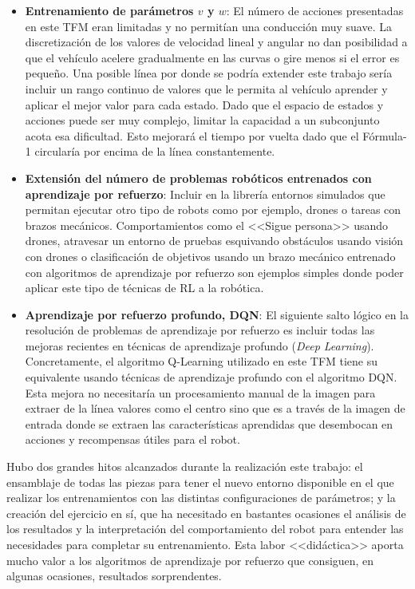 \begin{itemize}
    \item \textbf{Entrenamiento de parámetros $v$ y $w$}: El número de acciones presentadas en este TFM eran limitadas y no permitían una conducción muy suave. La discretización de los valores de velocidad lineal y angular no dan posibilidad a que el vehículo acelere gradualmente en las curvas o gire menos si el error es pequeño. Una posible línea por donde se podría extender este trabajo sería incluir un rango continuo de valores que le permita al vehículo aprender y aplicar el mejor valor para cada estado. Dado que el espacio de estados y acciones puede ser muy complejo, limitar la capacidad a un subconjunto acota esa dificultad. Esto mejorará el tiempo por vuelta dado que el Fórmula-1 circularía por encima de la línea constantemente.\\
    
    \item \textbf{Extensión del número de problemas robóticos entrenados con aprendizaje por refuerzo}: Incluir en la librería entornos simulados que permitan ejecutar otro tipo de robots como por ejemplo, drones o tareas con brazos mecánicos. Comportamientos como el <<Sigue persona>> usando drones, atravesar un entorno de pruebas esquivando obstáculos usando visión con drones o clasificación de objetivos usando un brazo mecánico entrenado con algoritmos de aprendizaje por refuerzo son ejemplos simples donde poder aplicar este tipo de técnicas de RL a la robótica.\\
    
    \item \textbf{Aprendizaje por refuerzo profundo, DQN}: El siguiente salto lógico en la resolución de problemas de aprendizaje por refuerzo es incluir todas las mejoras recientes en técnicas de aprendizaje profundo (\textit{Deep Learning}). Concretamente, el algoritmo Q-Learning utilizado en este TFM tiene su equivalente usando técnicas de aprendizaje profundo con el algoritmo DQN. Esta mejora no necesitaría un procesamiento manual de la imagen para extraer de la línea valores como el centro sino que es a través de la imagen de entrada donde se extraen las características aprendidas que desembocan en acciones y recompensas útiles para el robot.\\
    
\end{itemize}


Hubo dos grandes hitos alcanzados durante la realización este trabajo: el ensamblaje de todas las piezas para tener el nuevo entorno disponible en el que realizar los entrenamientos con las distintas configuraciones de parámetros; y la creación del ejercicio en sí, que ha necesitado en bastantes ocasiones el análisis de los resultados y la interpretación del comportamiento del robot para entender las necesidades para completar su entrenamiento. Esta labor <<didáctica>> aporta mucho valor a los algoritmos de aprendizaje por refuerzo que consiguen, en algunas ocasiones, resultados sorprendentes.\\

